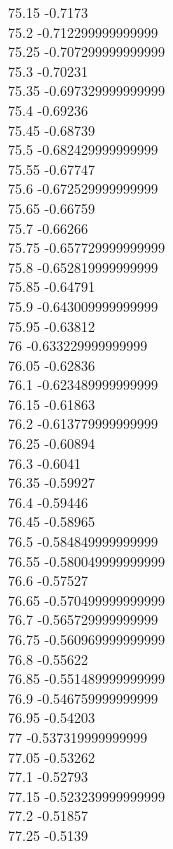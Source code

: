 {75.15	-0.7173\\
75.2	-0.712299999999999\\
75.25	-0.707299999999999\\
75.3	-0.70231\\
75.35	-0.697329999999999\\
75.4	-0.69236\\
75.45	-0.68739\\
75.5	-0.682429999999999\\
75.55	-0.67747\\
75.6	-0.672529999999999\\
75.65	-0.66759\\
75.7	-0.66266\\
75.75	-0.657729999999999\\
75.8	-0.652819999999999\\
75.85	-0.64791\\
75.9	-0.643009999999999\\
75.95	-0.63812\\
76	-0.633229999999999\\
76.05	-0.62836\\
76.1	-0.623489999999999\\
76.15	-0.61863\\
76.2	-0.613779999999999\\
76.25	-0.60894\\
76.3	-0.6041\\
76.35	-0.59927\\
76.4	-0.59446\\
76.45	-0.58965\\
76.5	-0.584849999999999\\
76.55	-0.580049999999999\\
76.6	-0.57527\\
76.65	-0.570499999999999\\
76.7	-0.565729999999999\\
76.75	-0.560969999999999\\
76.8	-0.55622\\
76.85	-0.551489999999999\\
76.9	-0.546759999999999\\
76.95	-0.54203\\
77	-0.537319999999999\\
77.05	-0.53262\\
77.1	-0.52793\\
77.15	-0.523239999999999\\
77.2	-0.51857\\
77.25	-0.5139\\
}
